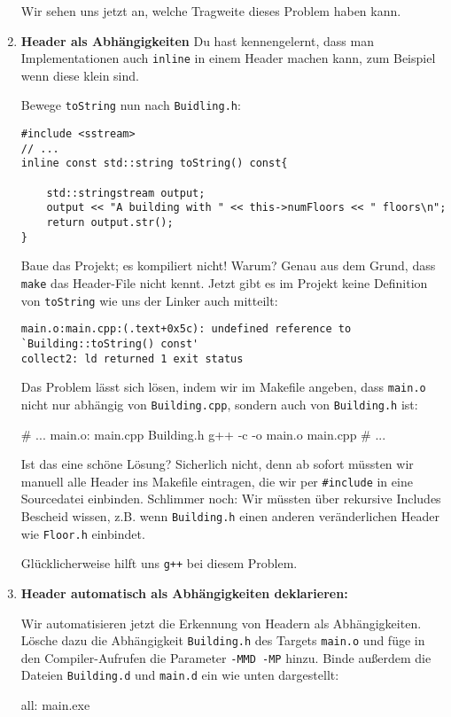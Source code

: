 \begin{enumerate}
Wir sehen uns jetzt an, welche Tragweite dieses Problem haben kann.


\item\textbf{Header als Abhängigkeiten}
Du hast kennengelernt, dass man Implementationen auch \texttt{inline} in einem Header machen kann, zum Beispiel wenn diese klein sind.

Bewege \texttt{toString} nun nach \texttt{Buidling.h}:
\begin{lstlisting}
#include <sstream>
// ...
inline const std::string toString() const{

    std::stringstream output;
    output << "A building with " << this->numFloors << " floors\n";
    return output.str();
}
\end{lstlisting}

Baue das Projekt; es kompiliert nicht! Warum? Genau aus dem Grund, dass \texttt{make} das Header-File nicht \glqq kennt\grqq{}.
Jetzt gibt es im Projekt keine Definition von \texttt{toString} wie uns der Linker auch mitteilt:
\begin{verbatim}
main.o:main.cpp:(.text+0x5c): undefined reference to `Building::toString() const'
collect2: ld returned 1 exit status
\end{verbatim}

Das Problem lässt sich lösen, indem wir im Makefile angeben, dass \texttt{main.o} nicht nur abhängig von \texttt{Building.cpp}, sondern auch von \texttt{Building.h} ist:
\begin{lstmake}
# ...
main.o: main.cpp Building.h
	g++ -c -o main.o main.cpp
# ...
\end{lstmake}

Ist das eine schöne Lösung?
Sicherlich nicht, denn ab sofort müssten wir manuell alle Header ins Makefile eintragen, die wir per \texttt{\#include} in eine Sourcedatei einbinden.
Schlimmer noch: Wir müssten über rekursive Includes Bescheid wissen, z.B. wenn \texttt{Building.h} einen anderen veränderlichen Header wie \texttt{Floor.h} einbindet.

Glücklicherweise hilft uns \texttt{g++} bei diesem Problem.

\item\textbf{Header automatisch als Abhängigkeiten deklarieren:}

Wir automatisieren jetzt die Erkennung von Headern als Abhängigkeiten.
Lösche dazu die Abhängigkeit \texttt{Building.h} des Targets \texttt{main.o} und füge in den Compiler-Aufrufen die Parameter \texttt{-MMD -MP} hinzu.
Binde außerdem die Dateien \texttt{Building.d} und \texttt{main.d} ein wie unten dargestellt:
\begin{lstmake}
all: main.exe


\end{lstmake}
\end{enumerate}
